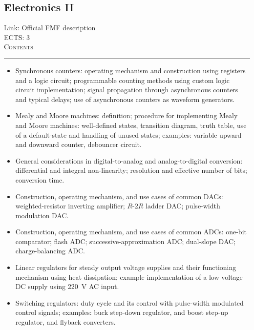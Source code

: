 \documentclass[11pt, a4paper]{article}
\newenvironment{course}[3]{
\subsection{#1}%
Link: \href{#2}{Official FMF description}\\%
ECTS: #3%
\vspace{1ex}
\\
{\large \textsc{Contents}}\\[-0.9ex]%
\rule{\textwidth}{0.5pt}
\vspace{-3ex}
}
{}
\newenvironment{chapter}[1]{
\begin{tcolorbox}[title=#1, breakable]
}
{\end{tcolorbox}}
\begin{document}
\begin{course}{Electronics II}{https://www.fmf.uni-lj.si/en/study-physics/programmes/1fiz/2020/7000777/courses/1135/}{3}
\begin{chapter}{Counters and finite-state machines}
\begin{itemize}
            \item Synchronous counters: operating mechanism and construction using registers and a logic circuit; programmable counting methods using custom logic circuit implementation; signal propagation through asynchronous counters and typical delays; use of asynchronous counters as waveform generators.

            \item Mealy and Moore machines: definition; procedure for implementing Mealy and Moore machines: well-defined states, transition diagram, truth table, use of a default-state and handling of unused states; examples: variable upward and downward counter, debouncer circuit.
        
        \end{itemize}
    \end{chapter}

    \begin{chapter}{Analog-digital conversion}
        \begin{itemize}
        
            \item General considerations in digital-to-analog and analog-to-digital conversion: differential and integral non-linearity; resolution and effective number of bits; conversion time.

            \item Construction, operating mechanism, and use cases of common DACs: weighted-resistor inverting amplifier; $ R $-$ 2R $ ladder DAC; pulse-width modulation DAC.

            \item Construction, operating mechanism, and use cases of common ADCs: one-bit comparator; flash ADC; successive-approximation ADC; dual-slope DAC; charge-balancing ADC.

        \end{itemize}
    \end{chapter}

    \begin{chapter}{Fundamentals of electronic regulation}
        \begin{itemize}
        
            \item Linear regulators for steady output voltage supplies and their functioning mechanism using heat dissipation; example implementation of a low-voltage DC supply using \SI{220}{\volt} AC input.

            \item Switching regulators: duty cycle and its control with pulse-width modulated control signals; examples: buck step-down regulator, and boost step-up regulator, and flyback converters.


\end{itemize}
\end{chapter}
\end{course}
\end{document}
